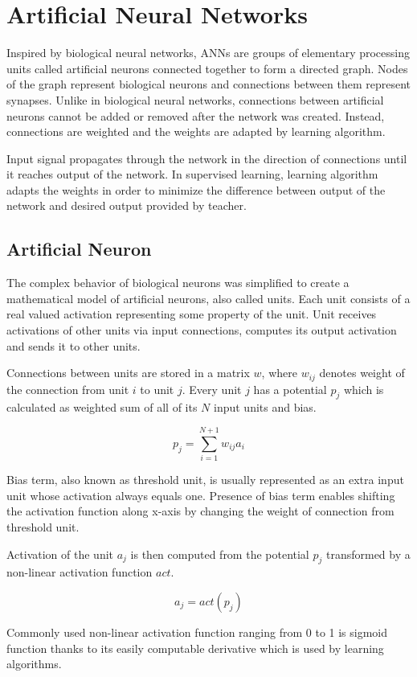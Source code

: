 \documentclass[12pt,oneside]{fithesis2}
\begin{document}
\chapter{Artificial Neural Networks}
Inspired by biological neural networks, ANNs are groups of elementary processing units called artificial neurons connected together to form a directed graph. Nodes of the graph represent biological neurons and connections between them represent synapses. Unlike in biological neural networks, connections between artificial neurons cannot be added or removed after the network was created. Instead, connections are weighted and the weights are adapted by learning algorithm. \par

Input signal propagates through the network in the direction of connections until it reaches output of the network. In supervised learning, learning algorithm adapts the weights in order to minimize the difference between output of the network and desired output provided by teacher.

\section{Artificial Neuron}
The complex behavior of biological neurons was simplified to create a mathematical model of artificial neurons, also called units. Each unit consists of a real valued activation representing some property of the unit. Unit receives activations of other units via input connections, computes its output activation and sends it to other units. \par
Connections between units are stored in a matrix $w$, where $w_{ij}$ denotes weight of the connection from unit $i$ to unit $j$. Every unit $j$ has a potential $p_j$ which is calculated as weighted sum of all of its $N$ input units and bias. \par

$$p_{j} = \sum\limits_{i = 1}^{N+1} w_{ij} a_{i}$$

Bias term, also known as threshold unit, is usually represented as an extra input unit whose activation always equals one. Presence of bias term enables shifting the activation function along x-axis by changing the weight of connection from threshold unit.

Activation of the unit $a_j$ is then computed from the potential $p_j$ transformed by a non-linear activation function $act$.

$$a_{j} = act\left(p_j\right)$$
\par
Commonly used non-linear activation function ranging from 0 to 1 is sigmoid function thanks to its easily computable derivative which is used by learning algorithms.
\end{document}

